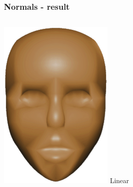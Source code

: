 	\begin{frame}\frametitle{Normals - result}
		\begin{columns}
			\begin{column}{0.4\textwidth}
			\begin{center}
					\includegraphics[width=\textwidth]{img/1_single/linearlyVaryingNormals.png}
					\small{Linear}
				\end{center}	
			\end{column}
			\begin{column}{0.4\textwidth}
			\begin{center}

\end{center}
\end{column}
\end{columns}
\end{frame}
